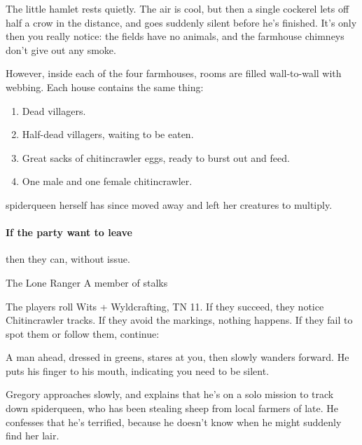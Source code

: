 \begin{multicols}{2}
\begin{boxtext}

	The little hamlet rests quietly.
	The air is cool, but then a single cockerel lets off half a crow in the distance, and goes suddenly silent before he's finished.
	It's only then you really notice: the fields have no animals, and the farmhouse chimneys don't give out any smoke.

\end{boxtext}

However, inside each of the four farmhouses, rooms are filled wall-to-wall with webbing.  Each house contains the same thing:

\begin{enumerate}

	\item{Dead villagers.}
	\item{Half-dead villagers, waiting to be eaten.}
	\item{Great sacks of chitincrawler eggs, ready to burst out and feed.}
	\item{One male and one female chitincrawler.}
\end{enumerate}

\Gls{spiderqueen} herself has since moved away and left her creatures to multiply.

\paragraph{If the party want to leave}
then they can, without issue.



{The Lone Ranger}%
{A member of  stalks }%

The players roll Wits + Wyldcrafting, TN 11.
If they succeed, they notice Chitincrawler tracks.
If they avoid the markings, nothing happens.
If they fail to spot them or follow them, continue:

\begin{boxtext}

	A man ahead, dressed in greens, stares at you, then slowly wanders forward.  He puts his finger to his mouth, indicating you need to be silent.

\end{boxtext}

Gregory approaches slowly, and explains that he's on a solo mission to track down \gls{spiderqueen}, who has been stealing sheep from local farmers of late.
He confesses that he's terrified, because he doesn't know when he might suddenly find her lair.


\end{multicols}
